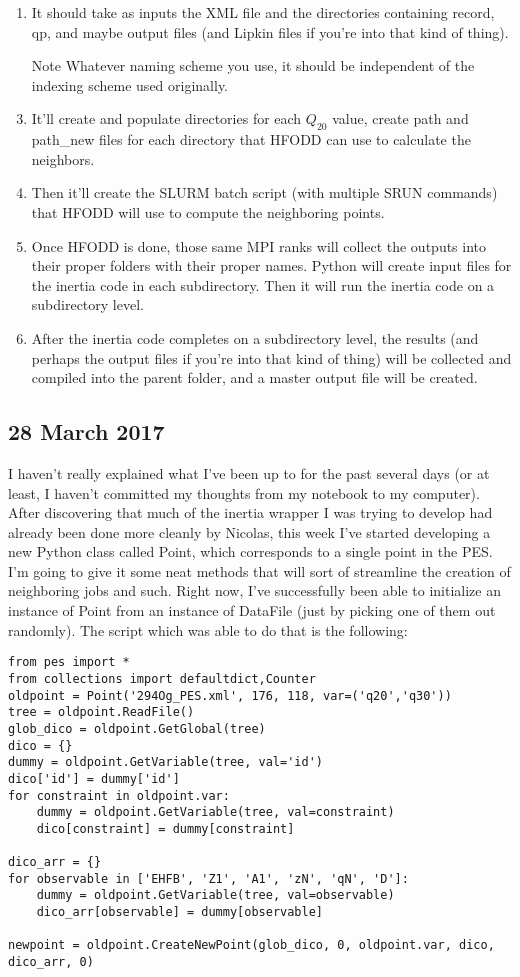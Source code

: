 \begin{enumerate}
\item It should take as inputs the XML file and the directories containing record, qp, and maybe output files (and Lipkin files if you're into that kind of thing).
\item[Note] Whatever naming scheme you use, it should be independent of the indexing scheme used originally.
\item It'll create and populate directories for each $Q_{20}$ value, create path and path\_new files for each directory that HFODD can use to calculate the neighbors.
\item Then it'll create the SLURM batch script (with multiple SRUN commands) that HFODD will use to compute the neighboring points.
\item Once HFODD is done, those same MPI ranks will collect the outputs into their proper folders with their proper names. Python will create input files for the inertia code in each subdirectory. Then it will run the inertia code on a subdirectory level.
\item After the inertia code completes on a subdirectory level, the results (and perhaps the output files if you're into that kind of thing) will be collected and compiled into the parent folder, and a master output file will be created.
\end{enumerate}  

\subsection*{28 March 2017}
I haven't really explained what I've been up to for the past several days (or at least, I haven't committed my thoughts from my notebook to my computer). After discovering that much of the inertia wrapper I was trying to develop had already been done more cleanly by Nicolas, this week I've started developing a new Python class called Point, which corresponds to a single point in the PES. I'm going to give it some neat methods that will sort of streamline the creation of neighboring jobs and such. Right now, I've successfully been able to initialize an instance of Point from an instance of DataFile (just by picking one of them out randomly). The script which was able to do that is the following:

\begin{verbatim}
from pes import * 
from collections import defaultdict,Counter
oldpoint = Point('294Og_PES.xml', 176, 118, var=('q20','q30'))
tree = oldpoint.ReadFile()
glob_dico = oldpoint.GetGlobal(tree)
dico = {}
dummy = oldpoint.GetVariable(tree, val='id')
dico['id'] = dummy['id']
for constraint in oldpoint.var:
	dummy = oldpoint.GetVariable(tree, val=constraint)
	dico[constraint] = dummy[constraint]
	
dico_arr = {}
for observable in ['EHFB', 'Z1', 'A1', 'zN', 'qN', 'D']:
	dummy = oldpoint.GetVariable(tree, val=observable)
	dico_arr[observable] = dummy[observable]
	
newpoint = oldpoint.CreateNewPoint(glob_dico, 0, oldpoint.var, dico, dico_arr, 0)
\end{verbatim}

